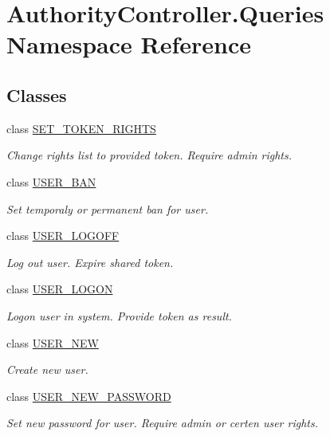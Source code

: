 \hypertarget{namespace_authority_controller_1_1_queries}{}\section{Authority\+Controller.\+Queries Namespace Reference}
\label{namespace_authority_controller_1_1_queries}
\subsection*{Classes}
\begin{DoxyCompactItemize}
\item 
class \mbox{\hyperlink{class_authority_controller_1_1_queries_1_1_s_e_t___t_o_k_e_n___r_i_g_h_t_s}{S\+E\+T\+\_\+\+T\+O\+K\+E\+N\+\_\+\+R\+I\+G\+H\+TS}}
\begin{DoxyCompactList}\small\item\em Change rights list to provided token. Require admin rights. \end{DoxyCompactList}\item 
class \mbox{\hyperlink{class_authority_controller_1_1_queries_1_1_u_s_e_r___b_a_n}{U\+S\+E\+R\+\_\+\+B\+AN}}
\begin{DoxyCompactList}\small\item\em Set temporaly or permanent ban for user. \end{DoxyCompactList}\item 
class \mbox{\hyperlink{class_authority_controller_1_1_queries_1_1_u_s_e_r___l_o_g_o_f_f}{U\+S\+E\+R\+\_\+\+L\+O\+G\+O\+FF}}
\begin{DoxyCompactList}\small\item\em Log out user. Expire shared token. \end{DoxyCompactList}\item 
class \mbox{\hyperlink{class_authority_controller_1_1_queries_1_1_u_s_e_r___l_o_g_o_n}{U\+S\+E\+R\+\_\+\+L\+O\+G\+ON}}
\begin{DoxyCompactList}\small\item\em Logon user in system. Provide token as result. \end{DoxyCompactList}\item 
class \mbox{\hyperlink{class_authority_controller_1_1_queries_1_1_u_s_e_r___n_e_w}{U\+S\+E\+R\+\_\+\+N\+EW}}
\begin{DoxyCompactList}\small\item\em Create new user. \end{DoxyCompactList}\item 
class \mbox{\hyperlink{class_authority_controller_1_1_queries_1_1_u_s_e_r___n_e_w___p_a_s_s_w_o_r_d}{U\+S\+E\+R\+\_\+\+N\+E\+W\+\_\+\+P\+A\+S\+S\+W\+O\+RD}}
\begin{DoxyCompactList}\small\item\em Set new password for user. Require admin or certen user rights. \end{DoxyCompactList}\end{DoxyCompactItemize}
